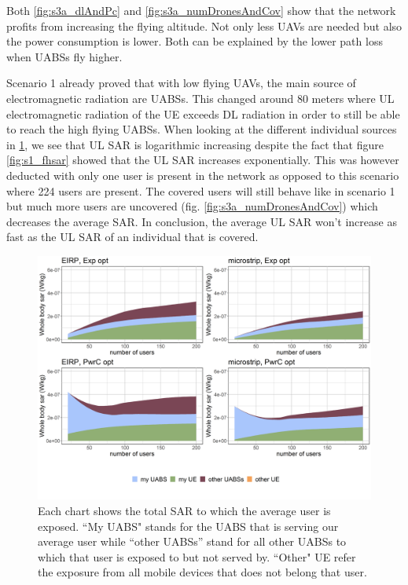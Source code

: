 Both  \ref{fig:s3a_dlAndPc} and \ref{fig:s3a_numDronesAndCov}  show that the network profits from increasing the flying altitude. 
Not only less \gls{UAV}s are needed but also the power consumption is lower. Both can be explained by the lower path loss when \gls{UABS}s fly higher.

Scenario 1 already proved that with low flying \gls{UAV}s, the main source of electromagnetic radiation are \gls{UABS}s. 
This changed around 80 meters where \gls{UL} electromagnetic radiation of the \gls{UE}
exceeds \gls{DL} radiation in order to still be able to reach the high flying \gls{UABS}s. 
When looking at the different individual sources in \ref{fig:s3a_fourSourcesMatrix}, we see 
that \gls{UL} \gls{SAR} is logarithmic increasing despite the fact that figure \ref{fig:s1_fhsar} showed that the  \gls{UL} \gls{SAR} 
increases exponentially. This was however deducted with only one user is present in the network as opposed to this scenario 
where 224 users are present. The covered users will still behave like in scenario 1 but much more users are uncovered (fig. \ref{fig:s3a_numDronesAndCov}) 
which decreases the average \gls{SAR}. 
In conclusion, the average  \gls{UL} \gls{SAR}  won't increase as fast as the \gls{UL} \gls{SAR} of 
an individual that is covered.

\begin{figure}[]
  \includegraphics[width=\textwidth]{../results/s3/fhFourSources.png}
  \caption{Each chart shows the total SAR to which the average user is exposed. ``My UABS" stands for the UABS that is serving our average user while ``other UABSs'' stand for 
  all other UABSs to which that user is exposed to but not served by. ``Other" UE refer the exposure from all mobile devices that does not belong that user.}
  \label{fig:s3a_fourSourcesMatrix}
\end{figure}

